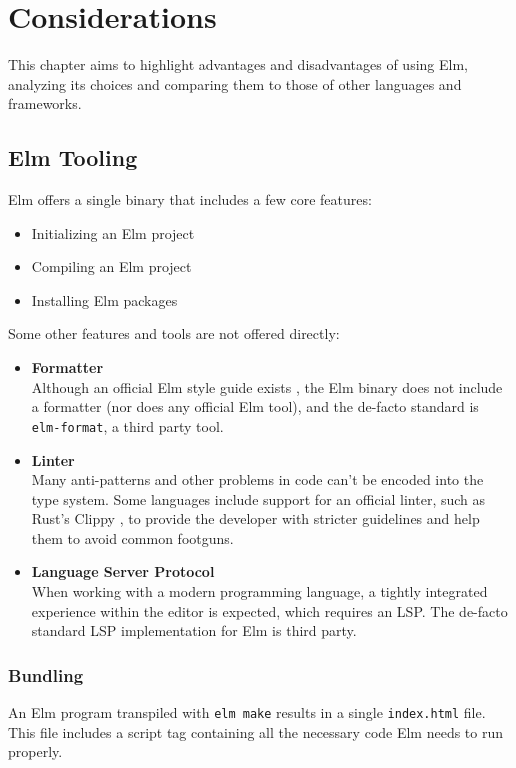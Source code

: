 \chapter{Considerations}
This chapter aims to highlight advantages and disadvantages of using Elm, analyzing its choices and comparing them to those of other languages and frameworks.

\section{Elm Tooling}
Elm offers a single binary that includes a few core features:
\begin{itemize}
    \item Initializing an Elm project
    \item Compiling an Elm project
    \item Installing Elm packages
\end{itemize}

Some other features and tools are not offered directly:
\begin{itemize}
    \item \textbf{Formatter}\\Although an official Elm style guide exists \cite{noauthor_style_nodate}, the Elm binary does not include a formatter (nor does any official Elm tool), and the de-facto standard is \texttt{elm-format}, a third party tool. \cite{vonderhaar_avh4elm-format_2024}
    \item \textbf{Linter}\\Many anti-patterns and other problems in code can't be encoded into the type system. Some languages include support for an official linter, such as Rust's Clippy \cite{noauthor_rust-langrust-clippy_2024}, to provide the developer with stricter guidelines and help them to avoid common footguns.
    \item \textbf{Language Server Protocol}\\When working with a modern programming language, a tightly integrated experience within the editor is expected, which requires an LSP. The de-facto standard LSP implementation for Elm is third party. \cite{noauthor_elm-toolingelm-language-server_nodate}
\end{itemize}

\subsection{Bundling}
An Elm program transpiled with \texttt{elm make} results in a single \texttt{index.html} file. This file includes a script tag containing all the necessary code Elm needs to run properly.\\

